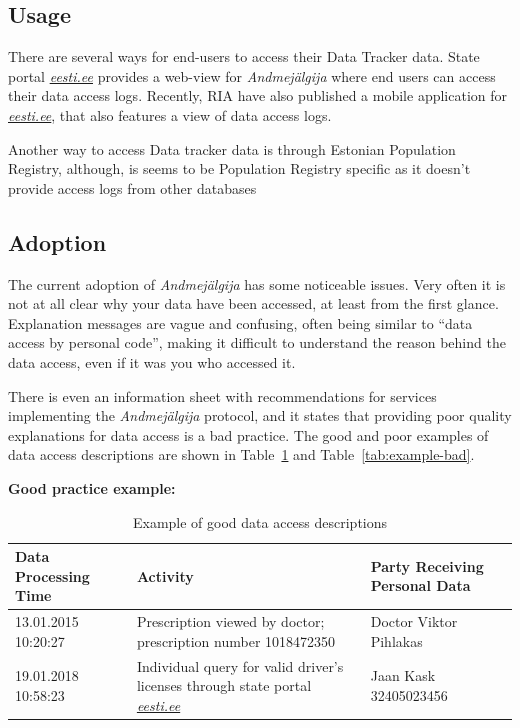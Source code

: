 \subsection{Usage}
There are several ways for end-users to access their Data Tracker data. State portal \textit{\href{https://www.eesti.ee}{eesti.ee}} provides a web-view for \textit{Andmejälgija} where end users can access their data access logs. Recently, RIA have also published a mobile application for \textit{\href{https://www.eesti.ee}{eesti.ee}}, that also features a view of data access logs. 

Another way to access Data tracker data is through Estonian Population Registry, although, is seems to be Population Registry specific as it doesn't provide access logs from other databases



\subsection{Adoption}
The current adoption of \textit{Andmejälgija} has some noticeable issues. Very often it is not at all clear why your data have been accessed, at least from the first glance. Explanation messages are vague and confusing, often being similar to ``data access by personal code'', making it difficult to understand the reason behind the data access, even if it was you who accessed it.

There is even an information sheet with recommendations for services implementing the \textit{Andmejälgija} protocol, and it states that providing poor quality explanations for data access is a bad practice\cite{ria-andmejalgija-recommendations}. The good and poor examples of data access descriptions are shown in Table~\ref{tab:example-good} and Table~\ref{tab:example-bad}.

\textbf{Good practice example:}

\begin{table}[H]
\centering
\begin{tabular}{|p{3cm}|p{6cm}|p{4cm}|}
\hline
\textbf{Data Processing Time} & \textbf{Activity} & \textbf{Party Receiving Personal Data} \\
\hline
13.01.2015 10:20:27 & Prescription viewed by doctor; prescription number 1018472350 & Doctor Viktor Pihlakas \\
\hline
19.01.2018 10:58:23 & Individual query for valid driver's licenses through state portal \textit{\href{https://www.eesti.ee}{eesti.ee}} & Jaan Kask 32405023456 \\
\hline
\end{tabular}
\caption{Example of good data access descriptions\cite{ria-andmejalgija-recommendations}}
\label{tab:example-good}
\end{table}

